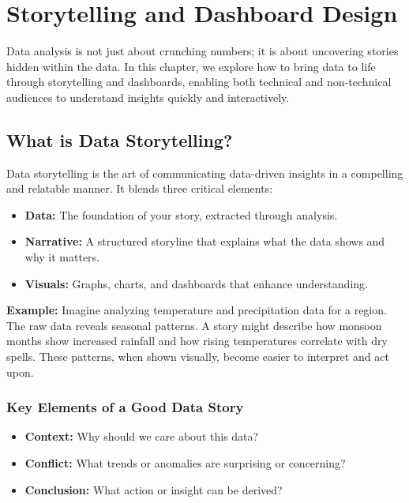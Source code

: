 \chapter{Storytelling and Dashboard Design}

Data analysis is not just about crunching numbers; it is about uncovering stories hidden within the data. In this chapter, we explore how to bring data to life through storytelling and dashboards, enabling both technical and non-technical audiences to understand insights quickly and interactively.

\section*{What is Data Storytelling?}

Data storytelling is the art of communicating data-driven insights in a compelling and relatable manner. It blends three critical elements:

\begin{itemize}
    \item \textbf{Data:} The foundation of your story, extracted through analysis.
    \item \textbf{Narrative:} A structured storyline that explains what the data shows and why it matters.
    \item \textbf{Visuals:} Graphs, charts, and dashboards that enhance understanding.
\end{itemize}

\textbf{Example:} Imagine analyzing temperature and precipitation data for a region. The raw data reveals seasonal patterns. A story might describe how monsoon months show increased rainfall and how rising temperatures correlate with dry spells. These patterns, when shown visually, become easier to interpret and act upon.

\subsection*{Key Elements of a Good Data Story}
\begin{itemize}
    \item \textbf{Context:} Why should we care about this data?
    \item \textbf{Conflict:} What trends or anomalies are surprising or concerning?
    \item \textbf{Conclusion:} What action or insight can be derived?
\end{itemize}

